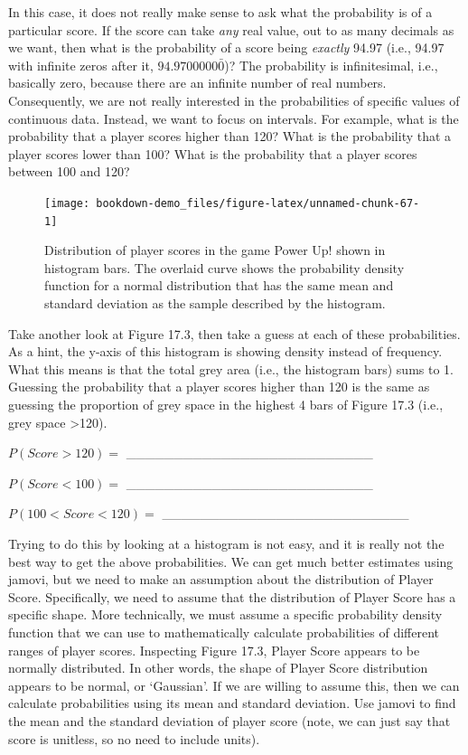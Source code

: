 \documentclass[
  openany]{krantz}
\begin{document}
In this case, it does not really make sense to ask what the probability is of a particular score.
If the score can take \emph{any} real value, out to as many decimals as we want, then what is the probability of a score being \emph{exactly} 94.97 (i.e., 94.97 with infinite zeros after it, \(94.9700000\bar{0}\))?
The probability is infinitesimal, i.e., basically zero, because there are an infinite number of real numbers.
Consequently, we are not really interested in the probabilities of specific values of continuous data.
Instead, we want to focus on intervals.
For example, what is the probability that a player scores higher than 120?
What is the probability that a player scores lower than 100?
What is the probability that a player scores between 100 and 120?

\begin{figure}
\texttt{[image: bookdown-demo\_files/figure-latex/unnamed-chunk-67-1]} \caption{Distribution of player scores in the game Power Up! shown in histogram bars. The overlaid curve shows the probability density function for a normal distribution that has the same mean and standard deviation as the sample described by the histogram.}\label{fig:unnamed-chunk-67}
\end{figure}

Take another look at Figure 17.3, then take a guess at each of these probabilities.
As a hint, the y-axis of this histogram is showing density instead of frequency.
What this means is that the total grey area (i.e., the histogram bars) sums to 1.
Guessing the probability that a player scores higher than 120 is the same as guessing the proportion of grey space in the highest 4 bars of Figure 17.3 (i.e., grey space \textgreater120).

\(P(Score>120) =\) \_\_\_\_\_\_\_\_\_\_\_\_\_\_\_\_\_\_\_\_\_\_\_\_\_\_

\(P(Score<100) =\) \_\_\_\_\_\_\_\_\_\_\_\_\_\_\_\_\_\_\_\_\_\_\_\_\_\_

\(P(100<Score<120) =\) \_\_\_\_\_\_\_\_\_\_\_\_\_\_\_\_\_\_\_\_\_\_\_\_\_\_

Trying to do this by looking at a histogram is not easy, and it is really not the best way to get the above probabilities.
We can get much better estimates using jamovi, but we need to make an assumption about the distribution of Player Score.
Specifically, we need to assume that the distribution of Player Score has a specific shape.
More technically, we must assume a specific probability density function that we can use to mathematically calculate probabilities of different ranges of player scores.
Inspecting Figure 17.3, Player Score appears to be normally distributed.
In other words, the shape of Player Score distribution appears to be normal, or `Gaussian'.
If we are willing to assume this, then we can calculate probabilities using its mean and standard deviation.
Use jamovi to find the mean and the standard deviation of player score (note, we can just say that score is unitless, so no need to include units).
\end{document}
